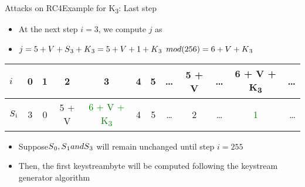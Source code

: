 \documentclass[
	aspectratio=169,	%
	onlytextwidth,		%
	t,					%
	]{beamer}
\begin{document}
\begin{frame}[fragile]{Attacks on RC4}{Example for K\textsubscript{3}: Last step}

	
	\begin{itemize}
		\item At the next step $i = 3$, we compute $j$ as
		\item $j = 5 + V + S\textsubscript{3} + K\textsubscript{3} = 5 + V + 1 + K\textsubscript{3}$ $mod(256) = 6 + V + K\textsubscript{3}$
	\end{itemize}
	
	\begin{table}[h!]
		\begin{center}
			\begin{tabular}{l|c|c|c|c|c|c|c|c|c|c|r}
			$i$ & 0 & 1 & 2 & 3 & 4 & 5 & \dots & 5 + V & \dots & 6 + V + K\textsubscript{3} & \dots\\
			\hline
			$S\textsubscript{i}$ & 3 & 0 & 5 + V & \textcolor{green}{6 + V + K\textsubscript{3}} & 4 & 5 & \dots & 2 & \dots & \textcolor{green}{1} & \dots\\
			\end{tabular}
		\end{center}
	\end{table}

	\begin{itemize}
		\item Suppose$ S\textsubscript{0}, S\textsubscript{1} and S\textsubscript{3}$ will remain unchanged until step $i = 255$
		\item Then, the first keystreambyte will be computed following the keystream generator algorithm
	\end{itemize}

\end{frame}
\end{document}

